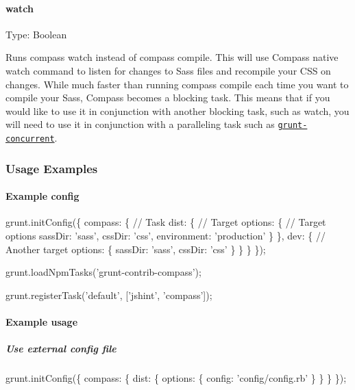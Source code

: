 \paragraph*{watch}

Type\+: {\ttfamily Boolean}

Runs {\ttfamily compass watch} instead of {\ttfamily compass compile}. This will use Compass\textquotesingle{} native watch command to listen for changes to Sass files and recompile your C\+SS on changes. While much faster than running {\ttfamily compass compile} each time you want to compile your Sass, Compass becomes a blocking task. This means that if you would like to use it in conjunction with another blocking task, such as {\ttfamily watch}, you will need to use it in conjunction with a paralleling task such as \href{https://github.com/sindresorhus/grunt-concurrent}{\tt grunt-\/concurrent}.

\subsubsection*{Usage Examples}

\paragraph*{Example config}


\begin{DoxyCode}
grunt.initConfig(\{
  compass: \{                  // Task
    dist: \{                   // Target
      options: \{              // Target options
        sassDir: 'sass',
        cssDir: 'css',
        environment: 'production'
      \}
    \},
    dev: \{                    // Another target
      options: \{
        sassDir: 'sass',
        cssDir: 'css'
      \}
    \}
  \}
\});

grunt.loadNpmTasks('grunt-contrib-compass');

grunt.registerTask('default', ['jshint', 'compass']);
\end{DoxyCode}


\paragraph*{Example usage}

\subparagraph*{Use external config file}


\begin{DoxyCode}
grunt.initConfig(\{
  compass: \{
    dist: \{
      options: \{
        config: 'config/config.rb'
      \}
    \}
  \}
\});
\end{DoxyCode}


